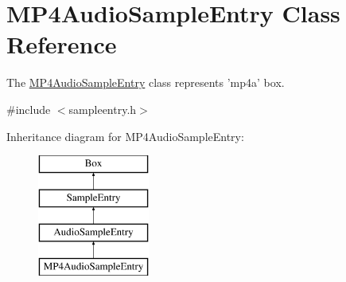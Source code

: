 \hypertarget{class_m_p4_audio_sample_entry}{\section{M\-P4\-Audio\-Sample\-Entry Class Reference}
\label{class_m_p4_audio_sample_entry}
}


The \hyperlink{class_m_p4_audio_sample_entry}{M\-P4\-Audio\-Sample\-Entry} class represents 'mp4a' box.  




{\ttfamily \#include $<$sampleentry.\-h$>$}

Inheritance diagram for M\-P4\-Audio\-Sample\-Entry\-:\begin{figure}[H]
\begin{center}
\leavevmode
\includegraphics[height=4.000000cm]{class_m_p4_audio_sample_entry}
\end{center}
\end{figure}
